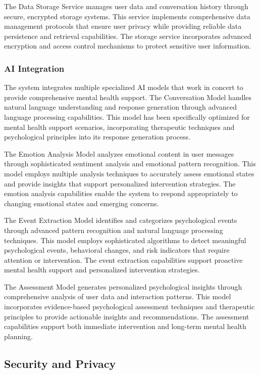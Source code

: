 The Data Storage Service manages user data and conversation history through secure, encrypted storage systems. This service implements comprehensive data management protocols that ensure user privacy while providing reliable data persistence and retrieval capabilities. The storage service incorporates advanced encryption and access control mechanisms to protect sensitive user information.

\subsubsection{AI Integration}

The system integrates multiple specialized AI models that work in concert to provide comprehensive mental health support. The Conversation Model handles natural language understanding and response generation through advanced language processing capabilities. This model has been specifically optimized for mental health support scenarios, incorporating therapeutic techniques and psychological principles into its response generation process.

The Emotion Analysis Model analyzes emotional content in user messages through sophisticated sentiment analysis and emotional pattern recognition. This model employs multiple analysis techniques to accurately assess emotional states and provide insights that support personalized intervention strategies. The emotion analysis capabilities enable the system to respond appropriately to changing emotional states and emerging concerns.

The Event Extraction Model identifies and categorizes psychological events through advanced pattern recognition and natural language processing techniques. This model employs sophisticated algorithms to detect meaningful psychological events, behavioral changes, and risk indicators that require attention or intervention. The event extraction capabilities support proactive mental health support and personalized intervention strategies.

The Assessment Model generates personalized psychological insights through comprehensive analysis of user data and interaction patterns. This model incorporates evidence-based psychological assessment techniques and therapeutic principles to provide actionable insights and recommendations. The assessment capabilities support both immediate intervention and long-term mental health planning.

\subsection{Security and Privacy}

